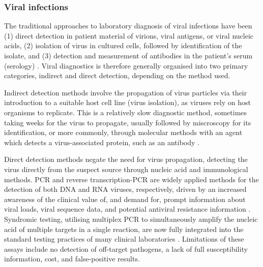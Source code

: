 \subsubsection{Viral infections}

The traditional approaches to laboratory diagnosis of viral infections have been (1) direct detection in patient material of virions, viral antigens, or viral nucleic acids, (2) isolation of virus in cultured cells, followed by identification of the isolate, and (3) detection and measurement of antibodies in the patient’s serum (serology) \citep{burrell_laboratory_2017}. Viral diagnostics is therefore generally organised into two primary categories, indirect and direct detection, depending on the method used. 

Indirect detection methods involve the propagation of virus particles via their introduction to a suitable host cell line (virus isolation), as viruses rely on host organisms to replicate. This is a relatively slow diagnostic method, sometimes taking weeks for the virus to propagate, usually followed by miscroscopy for its identification, or more commonly, through molecular methods with an agent which detects a virus-associated protein, such as an antibody \citep{cassedy_virus_2021}. 

Direct detection methods negate the need for virus propagation, detecting the virus directly from the suspect source through nucleic acid and immunological methods. PCR and reverse transcription-PCR are widely applied methods for the detection of both DNA and RNA viruses, respectively, driven by an increased awareness of the clinical value of, and demand for, prompt information about viral loads, viral sequence data, and potential antiviral resistance information \citep{cassedy_virus_2021}. Syndromic testing, utilising multiplex PCR to simultaneously amplify the nucleic acid of multiple targets in a single reaction, are now fully integrated into the standard testing practices of many clinical laboratories \citep{dien_bard_panels_2020}. Limitations of these assays include no detection of off-target pathogens, a lack of full susceptibility information, cost, and false-positive results.

